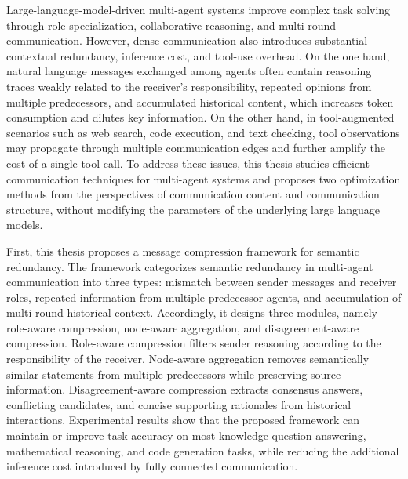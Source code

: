 \begin{abstractEn}
  Large-language-model-driven multi-agent systems improve complex task solving through role specialization, collaborative reasoning, and multi-round communication. However, dense communication also introduces substantial contextual redundancy, inference cost, and tool-use overhead. On the one hand, natural language messages exchanged among agents often contain reasoning traces weakly related to the receiver's responsibility, repeated opinions from multiple predecessors, and accumulated historical content, which increases token consumption and dilutes key information. On the other hand, in tool-augmented scenarios such as web search, code execution, and text checking, tool observations may propagate through multiple communication edges and further amplify the cost of a single tool call. To address these issues, this thesis studies efficient communication techniques for multi-agent systems and proposes two optimization methods from the perspectives of communication content and communication structure, without modifying the parameters of the underlying large language models.

  First, this thesis proposes a message compression framework for semantic redundancy. The framework categorizes semantic redundancy in multi-agent communication into three types: mismatch between sender messages and receiver roles, repeated information from multiple predecessor agents, and accumulation of multi-round historical context. Accordingly, it designs three modules, namely role-aware compression, node-aware aggregation, and disagreement-aware compression. Role-aware compression filters sender reasoning according to the responsibility of the receiver. Node-aware aggregation removes semantically similar statements from multiple predecessors while preserving source information. Disagreement-aware compression extracts consensus answers, conflicting candidates, and concise supporting rationales from historical interactions. Experimental results show that the proposed framework can maintain or improve task accuracy on most knowledge question answering, mathematical reasoning, and code generation tasks, while reducing the additional inference cost introduced by fully connected communication.


\end{abstractEn}
